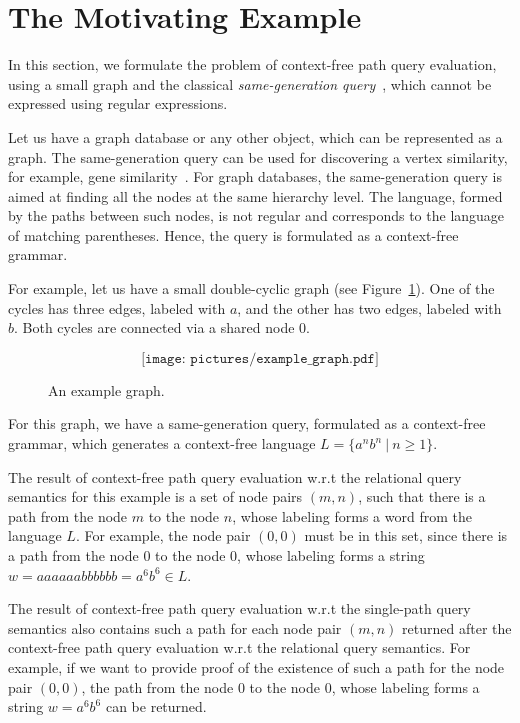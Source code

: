 \section{The Motivating Example}
\label{section_motivating}

In this section, we formulate the problem of context-free path query evaluation, using a small graph and the classical \emph{same-generation query}~\cite{FndDB}, which cannot be expressed using regular expressions.

Let us have a graph database or any other object, which can be represented as a graph. The same-generation query can be used for discovering a vertex similarity, for example, gene similarity~\cite{GraphQueryWithEarley}. For graph databases, the same-generation query is aimed at finding all the nodes at the same hierarchy level. The language, formed by the paths between such nodes, is not regular and corresponds to the language of matching parentheses. Hence, the query is formulated as a context-free grammar.

For example, let us have a small double-cyclic graph (see Figure~\ref{Example_Graph}). One of the cycles has three edges, labeled with $a$, and the other has two edges, labeled with $b$. Both cycles are connected via a shared node $0$.

\begin{figure}[h]
	\[
	\texttt{[image: pictures/example\_graph.pdf]}
	\]
	\caption{An example graph.}
	\label{Example_Graph}
\end{figure}

For this graph, we have a same-generation query, formulated as a context-free grammar, which generates a context-free language \mbox{$L=\{a^n b^n~|~n \geq 1\}$}.

The result of context-free path query evaluation w.r.t the relational query semantics for this example is a set of node pairs \mbox{$(m, n)$}, such that there is a path from the node $m$ to the node $n$, whose labeling forms a word from the language $L$. For example, the node pair \mbox{$(0,0)$} must be in this set, since there is a path from the node $0$ to the node $0$, whose labeling forms a string \mbox{$w = aaaaaabbbbbb = a^6b^6 \in L$}.

The result of context-free path query evaluation w.r.t the single-path query semantics also contains such a path for each node pair \mbox{$(m, n)$} returned after the context-free path query evaluation w.r.t the relational query semantics. For example, if we want to provide proof of the existence of such a path for the node pair \mbox{$(0,0)$}, the path from the node $0$ to the node $0$, whose labeling forms a string \mbox{$w = a^6b^6$} can be returned. 